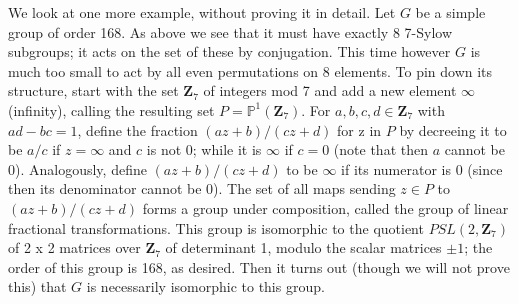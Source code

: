 \documentclass[10pt]{article} \usepackage{amsmath, amssymb}
\begin{document}
We look at one more example, without proving it in detail. Let $G$ be a
simple group of order 168. As above we see that it must have exactly 8
7-Sylow subgroups; it acts on the set of these by conjugation. This time
however $G$ is much too small to act by all even permutations on 8
elements. To pin down its structure, start with the set $\mathbf{Z}_7$
of integers mod 7 and add a new element $\infty$ (infinity), calling the
resulting set $P=\mathbb P^1(\mathbf{Z}_7)$. For $a,b,c,d\in
\mathbf{Z}_7$ with $ad-bc=1$, define the fraction $(az + b)/(cz + d)$
for z in $P$ by decreeing it to be $a/c$ if $z=\infty$ and $c$ is not 0;
while it is $\infty$ if $c=0$ (note that then $a$ cannot be 0).
Analogously, define $(az+b)/(cz+d)$ to be $\infty$ if its numerator is 0
(since then its denominator cannot be 0). The set of all maps sending
$z\in P$ to $(az+b)/(cz+d)$ forms a group under composition, called the
group of linear fractional transformations. This group is isomorphic to
the quotient $PSL(2,\mathbf{Z}_7)$ of 2 x 2 matrices over $\mathbf{Z}_7$
of determinant 1, modulo the scalar matrices $\pm1$; the order of this
group is 168, as desired. Then it turns out (though we will not prove
this) that $G$ is necessarily isomorphic to this group.
\end{document}
